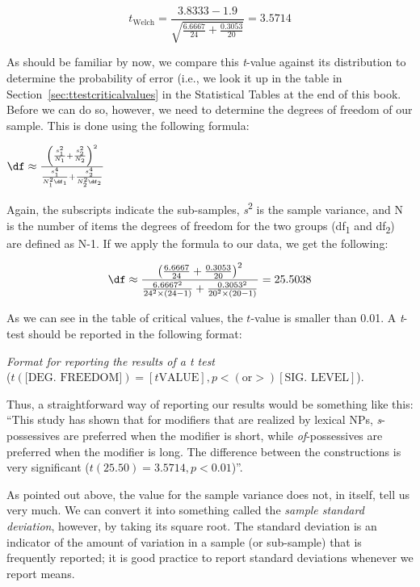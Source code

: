 \[t_{\text{Welch}} = \frac{3.8333 - 1.9}{\sqrt{\frac{6.6667}{24} + \frac{0.3053}{20}}} = 3.5714\]

As should be familiar by now, we compare this \textit{t}-value against its distribution  to determine the probability  of error (i.e., we look it up in the table in Section~\ref{sec:ttestcriticalvalues} in the Statistical Tables at the end of this book. Before we can do so, however, we need to determine the degrees of freedom of our sample. This is done using the following formula:

\begin{exe}
\ex $\df \approx \frac{\left(\frac{s_1^2}{N_1} + \frac{s_2^2}{N_2}\right)^2}{\frac{s_1^4}{N_1^2 \df_1} + \frac{s_2^4}{N_2^2 \df_2}}$
\label{ex:formulawelchdf}
\end{exe}

Again, the subscripts indicate the sub\hyp{}samples, \textit{s}\textsuperscript{2} is the sample variance,  and N is the number of items the degrees of freedom for the two groups (df\textsubscript{1} and df\textsubscript{2}) are defined as N\hyp{}1. If we apply the formula to our data, we get the following:

\[\df \approx \frac{\left(\frac{6.6667}{24} + \frac{0.3053}{20}\right)^2}{\frac{6.6667^2}{24^2 \times (24-1)} + \frac{0.3053^2}{20^2 \times (20-1)}} = 25.5038\]

As we can see in the table of critical values, the $t$-value is smaller than 0.01. A \textit{t}-test  should be reported in the following format:

\begin{exe}
\ex \textit{Format for reporting the results of a t test} \\
($t (\text{[DEG. FREEDOM]}) = [t \text{VALUE}], p < (\text{or} >) [\text{SIG. LEVEL}]$).
\label{ex:reportingwelchst}
\end{exe}

Thus, a straightforward way of reporting our results would be something like this: ``This study has shown that for modifiers that are realized by lexical NPs, \textit{s}-possessives  are preferred when the modifier is short, while \textit{of}-possessives are preferred when the modifier is long. The difference between the constructions is very significant  ($t(25.50) = 3.5714, p < 0.01$)''.

As pointed out above, the value for the sample variance  does not, in itself, tell us very much. We can convert it into something called the \textit{sample standard deviation}, however, by taking its square root. The standard deviation is an indicator of the amount of variation  in a sample (or sub\hyp{}sample) that is frequently reported; it is good practice to report standard deviations whenever we report means.

